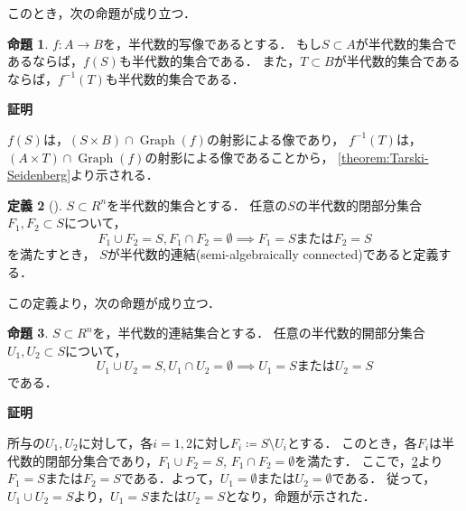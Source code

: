 \documentclass[uplatex, dvipdfmx]{jsarticle}
\makeatletter
\numberwithin{equation}{section}
\renewenvironment{proof}[1][\proofname]{\par
  \pushQED{\qed}%
  \normalfont \topsep6\p@\@plus6\p@\relax
  \trivlist
  \item\relax
  {\bfseries
  #1\@addpunct{.}}\hspace\labelsep\ignorespaces
}{
  \popQED\endtrivlist\@endpefalse
}
\newcommand{\map}[3]{{#1}\colon{#2}\rightarrow{#3}}
\DeclareMathOperator{\Graph}{Graph}
\theoremstyle{definition}
\newtheorem{definition}{定義}[section]
\newtheorem{proposition}[definition]{命題}
\renewcommand{\proofname}{\textbf{証明}}
\makeatother
\begin{document}
このとき，次の命題が成り立つ．

\begin{proposition}\label{proposition:image-preimage}
     $\map{f}{A}{B}$を，半代数的写像であるとする．
     もし$S \subset A$が半代数的集合であるならば，$f(S)$も半代数的集合である．
     また，$T \subset B$が半代数的集合であるならば，$f^{-1}(T)$も半代数的集合である．
\end{proposition}

\begin{proof}
     $f(S)$は，$(S \times B) \cap \Graph(f)$の射影による像であり，
     $f^{-1}(T)$は，$(A \times T) \cap \Graph(f)$の射影による像であることから，
     \cref{theorem:Tarski-Seidenberg}より示される．
\end{proof}

\begin{definition}[{\cite[Definition 2.4.2]{MR1659509}}]\label{definition:semi-alg-conn}
     $S \subset R^n$を半代数的集合とする．
     任意の$S$の半代数的閉部分集合$F_1, F_2 \subset S$について，
     \begin{equation}
          F_1 \cup F_2 = S, F_1 \cap F_2 = \emptyset \implies \text{$F_1 = S$または$F_2 = S$} 
     \end{equation}
     を満たすとき，
     $S$が半代数的連結(semi-algebraically connected)であると定義する．
\end{definition}

この定義より，次の命題が成り立つ．

\begin{proposition}\label{proposition:connectedness}
     $S \subset R^n$を，半代数的連結集合とする．
     任意の半代数的開部分集合$U_1, U_2 \subset S$について，
     \begin{equation}
          U_1 \cup U_2 = S, U_1 \cap U_2 = \emptyset \implies \text{$U_1 = S$または$U_2 = S$}
     \end{equation}
     である．
\end{proposition}

\begin{proof}
     所与の$U_1, U_2$に対して，各$i=1, 2$に対し$F_i\coloneqq S \setminus U_i$とする．
     このとき，各$F_i$は半代数的閉部分集合であり，$F_1 \cup F_2 = S$, $F_1 \cap F_2 = \emptyset$を満たす．
     ここで，\cref{definition:semi-alg-conn}より$F_1 = S$または$F_2 = S$である．よって，$U_1 = \emptyset$または$U_2 = \emptyset$である．
     従って，$U_1 \cup U_2 = S$より，$U_1 = S$または$U_2 = S$となり，命題が示された．
\end{proof}
\end{document}

